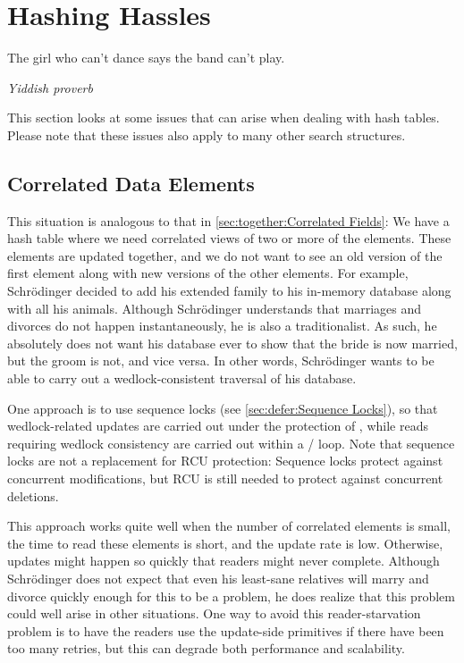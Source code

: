 
\section{Hashing Hassles}
\label{sec:together:Hashing Hassles}
%
\epigraph{The girl who can't dance says the band can't play.}
	 {\emph{Yiddish proverb}}

This section looks at some issues that can arise when dealing with
hash tables.
Please note that these issues also apply to many other search structures.

\subsection{Correlated Data Elements}
\label{sec:together:Correlated Data Elements}

This situation is analogous to that in
\cref{sec:together:Correlated Fields}:
We have a hash table where we need correlated views of two or more of
the elements.
These elements are updated together, and we do not want to see an old
version of the first element along with new versions of the other
elements.
For example, Schr\"odinger decided to add his extended family to his
in-memory database along with all his animals.
Although Schr\"odinger understands that marriages and divorces do not
happen instantaneously, he is also a traditionalist.
As such, he absolutely does not want his database ever to show that the
bride is now married, but the groom is not, and vice versa.
In other words, Schr\"odinger wants to be able to carry out a
wedlock-consistent traversal of his database.

One approach is to use sequence locks
(see \cref{sec:defer:Sequence Locks}),
so that wedlock-related updates are carried out under the
protection of , while reads requiring
wedlock consistency are carried out within
a  /  loop.
Note that sequence locks are not a replacement for RCU protection:
Sequence locks protect against concurrent modifications, but RCU
is still needed to protect against concurrent deletions.

This approach works quite well when the number of correlated elements is
small, the time to read these elements is short, and the update rate is
low.
Otherwise, updates might happen so quickly that readers might never complete.
Although Schr\"odinger does not expect that even his least-sane relatives
will marry and divorce quickly enough for this to be a problem,
he does realize that this problem could well arise in other situations.
One way to avoid this reader-starvation problem is to have the readers
use the update-side primitives if there have been too many retries,
but this can degrade both performance and scalability.

